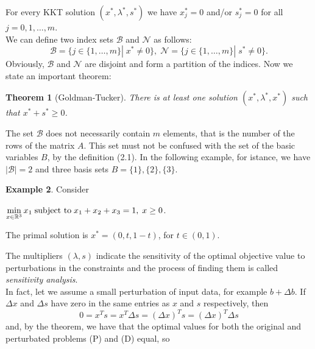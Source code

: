 \documentclass[a4paper,10 pt,titlepage,twoside]{book}
\theoremstyle{plain}
\newtheorem{thm}{Theorem}[chapter]
\theoremstyle{definition}
\newtheorem{ex}[thm]{Example}
\theoremstyle{remark}
\begin{document}
For every KKT solution $(x^{*}, \lambda^{*}, s^{*})$ we have $x_{j}^{*}= 0$ and/or $s_{j}^{*}= 0$ for all $j=0,1,\dots,m$.\\
We can define two index sets $\mathcal{B}$ and $\mathcal{N}$ as follows:
\begin{equation}\label{index}
\mathcal{B} =\{j\in\{1,\dots,m\}|\; x^{*} \not= 0\}, \;
\mathcal{N} =\{j\in\{1,\dots,m\}|\; s^{*} \not= 0\}.
\end{equation}  
Obviously, $\mathcal{B}$ and $\mathcal{N}$ are disjoint and form a partition of the indices. Now we state an important theorem:
\begin{thm}[Goldman-Tucker]
	There is at least one solution $(x^{*}, \lambda^{*}, x^{*})$ such that $x^{*}+s^{*}\geq0$.
\end{thm}
The set $\mathcal{B}$ does not necessarily contain $m$ elements, that is the number of the rows of the matrix $A$. This set must not be confused with the set of the basic variables $B$, by the definition (2.1). In the following example, for istance, we have $|\mathcal{B}|= 2$ and three basis sets $B = \{1\}, \{2\}, \{3\}$.
\begin{ex}
Consider
\begin{center} $\min\limits_{x\in\mathbb{R}^{3}} x_{1} \text{\;subject to\;} x_{1}+x_{2}+x_{3} = 1,\; x\geq 0$.\end{center}
The primal solution is $x^{*}=(0, t, 1-t)$, for $t\in(0,1)$. 	
\end{ex} 

The multipliers $(\lambda,s)$ indicate the sensitivity of the optimal objective value  to perturbations in the constraints and the process of finding them is called \textit{sensitivity analysis}. \\ In fact, let we assume a small perturbation of input data, for example $b + \Delta b$. If $\Delta x$ and $\Delta s$ have zero in the same entries as $x$ and $s$ respectively, then
\begin{equation*}
0=x^{T}s=x^{T}\Delta s= \left( \Delta x\right)^{T}s=\left( \Delta x\right)^{T}\Delta s
\end{equation*}
and, by the theorem, we have that the optimal values for both the original and perturbated problems (P) and (D) equal, so
\end{document}
